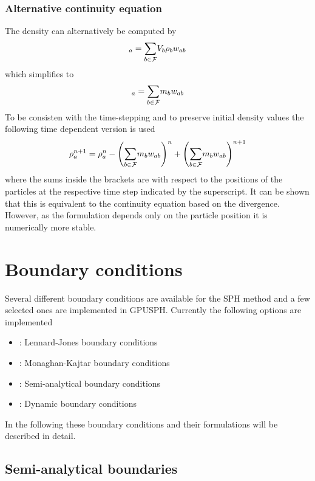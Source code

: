 \subsubsection{Alternative continuity equation}
The density can alternatively be computed by
\begin{equation}
[\rho]_a = \sumF V_b \rho_b w_{ab}
\end{equation}
which simplifies to
\begin{equation}
[\rho]_a = \sumF m_b w_{ab}
\label{e:sph:sumrho}
\end{equation}
To be consisten with the time-stepping and to preserve initial density
values the following time dependent version is used
\begin{equation}
\rho_a^{n+1} = \rho_a^n - \left(\underset{b \in \mathcal{F}}{\sum} m_b w_{ab}\right)^n + \left(\underset{b \in \mathcal{F}}{\sum}
m_b w_{ab}\right)^{n+1}
\label{e:sph:sumrho-time}
\end{equation}
where the sums inside the brackets are with respect to the positions of
the particles at the respective time step indicated by the superscript.
It can be shown  that this is equivalent to the
continuity equation based on the divergence. However, as the formulation
depends only on the particle position it is numerically more stable.

\section{Boundary conditions}\label{sec:boundary_conditions}

Several different boundary conditions are available for the SPH method
and a few selected ones are implemented in GPUSPH. Currently the
following options are implemented
\begin{itemize}
  \item {}: Lennard-Jones boundary conditions
  \item {}: Monaghan-Kajtar boundary conditions
  \item {}: Semi-analytical boundary conditions
  \item {}: Dynamic boundary conditions
\end{itemize}
In the following these boundary conditions and their formulations will
be described in detail.

\subsection{Semi-analytical boundaries}

